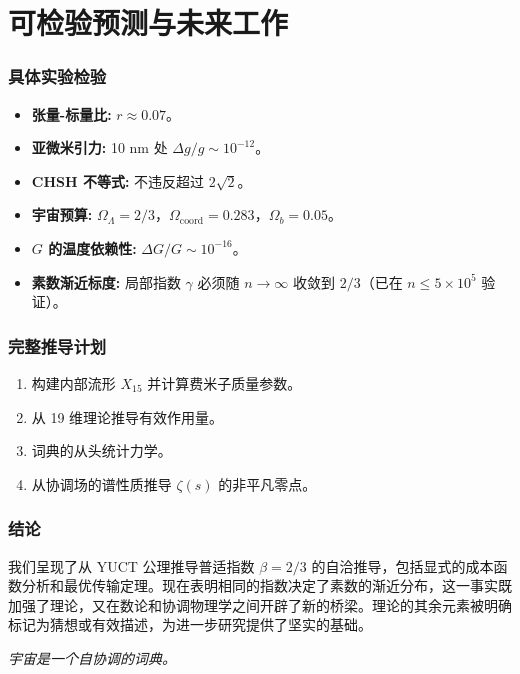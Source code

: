 \documentclass[11pt,a4paper]{article}
\newcommand{\coord}{\mathrm{coord}}
\begin{document}
	\part{可检验预测与未来工作}
	
	\section{具体实验检验}
	\begin{itemize}
		\item \textbf{张量-标量比:} \(r \approx 0.07\)。
		\item \textbf{亚微米引力:} 10 nm 处 \(\Delta g/g \sim 10^{-12}\)。
		\item \textbf{CHSH 不等式:} 不违反超过 \(2\sqrt{2}\)。
		\item \textbf{宇宙预算:} \(\Omega_\Lambda = 2/3\)，\(\Omega_{\coord} = 0.283\)，\(\Omega_b = 0.05\)。
		\item \textbf{\(G\) 的温度依赖性:} \(\Delta G/G \sim 10^{-16}\)。
		\item \textbf{素数渐近标度:} 局部指数 \(\gamma\) 必须随 \(n\to\infty\) 收敛到 \(2/3\)（已在 \(n\le 5\times10^5\) 验证）。
	\end{itemize}
	
	\section{完整推导计划}
	\begin{enumerate}
		\item 构建内部流形 \(X_{15}\) 并计算费米子质量参数。
		\item 从 19 维理论推导有效作用量。
		\item 词典的从头统计力学。
		\item 从协调场的谱性质推导 \(\zeta(s)\) 的非平凡零点。
	\end{enumerate}
	
	\section{结论}
	我们呈现了从 YUCT 公理推导普适指数 \(\beta = 2/3\) 的自洽推导，包括显式的成本函数分析和最优传输定理。现在表明相同的指数决定了素数的渐近分布，这一事实既加强了理论，又在数论和协调物理学之间开辟了新的桥梁。理论的其余元素被明确标记为猜想或有效描述，为进一步研究提供了坚实的基础。
	
	\begin{center}
		\textit{宇宙是一个自协调的词典。}
	\end{center}
	
\end{document}
